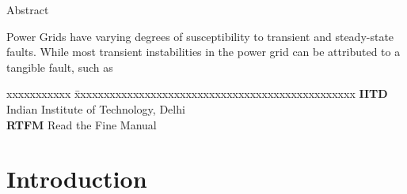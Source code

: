 \documentclass[Other]{iitddiss}
\begin{document}



Abstract

\abstract
Power Grids have varying degrees of susceptibility to transient and steady-state faults. While most transient instabilities in the power grid can be attributed to a tangible fault, such as  





\begin{singlespace}
\tableofcontents
\thispagestyle{empty}

\listoftables
{}
\listoffigures
{}
\end{singlespace}


\abbreviations

\noindent
\begin{tabbing}
xxxxxxxxxxx \= xxxxxxxxxxxxxxxxxxxxxxxxxxxxxxxxxxxxxxxxxxxxxxxx \kill
\textbf{IITD}   \> Indian Institute of Technology, Delhi \\
\textbf{RTFM} \> Read the Fine Manual \\
\end{tabbing}

\pagebreak

\pagebreak
\clearpage




\chapter{Introduction}
\label{chap:intro}
\end{document}
